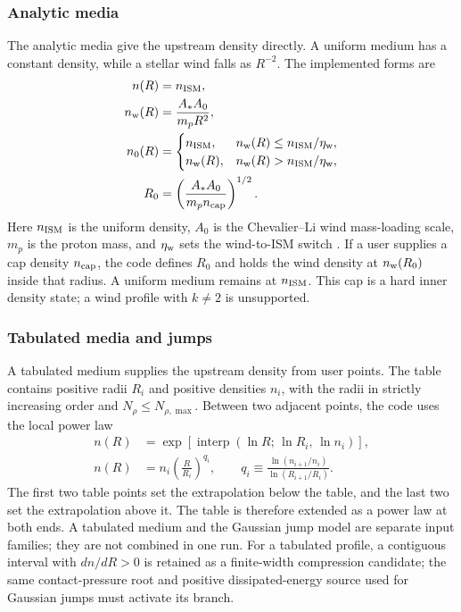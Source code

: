 \documentclass[twocolumn]{aastex702}
\begin{document}
\subsubsection{Analytic media}

The analytic media give the upstream density directly.  A uniform medium has a
constant density, while a stellar wind falls as \(R^{-2}\).  The implemented
forms are
\begin{equation}
\begin{aligned}
n(R) &= n_{\rm ISM},\\
n_{\rm w}(R) &= \frac{A_\ast A_0}{m_pR^2},\\
n_0(R) &=
\begin{cases}
n_{\rm ISM}, & n_{\rm w}(R)\le n_{\rm ISM}/\eta_{\rm w},\\
n_{\rm w}(R), & n_{\rm w}(R)> n_{\rm ISM}/\eta_{\rm w},
\end{cases}\\
R_0 &= \left(\frac{A_\ast A_0}{m_p n_{\rm cap}}\right)^{1/2}.
\end{aligned}
\end{equation}
Here \(n_{\rm ISM}\) is the uniform density, \(A_0\) is the Chevalier--Li wind
mass-loading scale, \(m_p\) is the proton mass, and \(\eta_{\rm w}\) sets the
wind-to-ISM switch \citep{ChevalierLi2000}.  If a user supplies a cap density
\(n_{\rm cap}\), the code defines \(R_0\) and holds the wind density at
\(n_{\rm w}(R_0)\) inside that radius.  A uniform medium remains at
\(n_{\rm ISM}\).  This cap is a hard inner density state; a wind profile with
\(k\ne2\) is unsupported.

\subsubsection{Tabulated media and jumps}

A tabulated medium supplies the upstream density from user points.  The table
contains positive radii \(R_i\) and positive densities \(n_i\), with the radii in
strictly increasing order and \(N_\rho\le N_{\rho,\max}\).  Between two adjacent
points, the code uses the local power law
\begin{equation}
\begin{aligned}
n(R) &=
\exp\left[
\operatorname{interp}\left(\ln R;\,\ln R_i,\,\ln n_i\right)
\right],\\
n(R) &=
n_i
\left(\frac{R}{R_i}\right)^{q_i},\qquad
q_i\equiv\frac{\ln(n_{i+1}/n_i)}{\ln(R_{i+1}/R_i)} .
\end{aligned}
\end{equation}
The first two table points set the extrapolation below the table, and the last
two set the extrapolation above it.  The table is therefore extended as a power
law at both ends.  A tabulated medium and the Gaussian jump model are separate
input families; they are not combined in one run.  For a tabulated profile, a
contiguous interval with \(dn/dR>0\) is retained as a finite-width compression
candidate; the same contact-pressure root and positive dissipated-energy source
used for Gaussian jumps must activate its branch.
\end{document}
